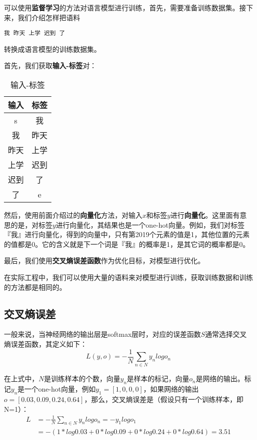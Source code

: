 可以使用\textbf{监督学习}的方法对语言模型进行训练，首先，需要准备训练数据集。接下来，我们介绍怎样把语料
\begin{lstlisting}[numbers=none]
    我 昨天 上学 迟到 了
\end{lstlisting}

转换成语言模型的训练数据集。

首先，我们获取\textbf{输入-标签}对：

\begin{table}[!h]
	\centering
	\setlength{\tabcolsep}{10mm}
	\caption{输入-标签}
	\begin{tabular}{cc}
		\hline
		输入 & 标签 \\ \hline
		s    & 我   \\
		我   & 昨天 \\
		昨天 & 上学 \\
		上学 & 迟到 \\
		迟到 & 了   \\
		了   & e    \\ \hline
	\end{tabular}
\end{table}


然后，使用前面介绍过的\textbf{向量化}方法，对输入$x$和标签$y$进行\textbf{向量化}。这里面有意思的是，对标签$y$进行向量化，其结果也是一个one-hot向量。例如，我们对标签『我』进行向量化，得到的向量中，只有第2019个元素的值是1，其他位置的元素的值都是0。它的含义就是下一个词是『我』的概率是1，是其它词的概率都是0。

最后，我们使用\textbf{交叉熵误差函数}作为优化目标，对模型进行优化。

在实际工程中，我们可以使用大量的语料来对模型进行训练，获取训练数据和训练的方法都是相同的。

\subsection{交叉熵误差}\label{Rnn:13}

一般来说，当神经网络的输出层是softmax层时，对应的误差函数$S$通常选择交叉熵误差函数，其定义如下：
\[
	L(y,o)=-\frac{1}{N}\sum_{n\in{N}}{y_nlogo_n}
\]

在上式中，$N$是训练样本的个数，向量\(y_n\)是样本的标记，向量\(o_n\)是网络的输出。标记\(y_n\)是一个one-hot向量，例如\(y_1=[1,0,0,0]\)，如果网络的输出\(o=[0.03,0.09,0.24,0.64]\)，那么，交叉熵误差是（假设只有一个训练样本，即N=1）：
\begin{align*}
	L & =-\frac{1}{N}\sum_{n\in{N}}{y_nlogo_n}=-y_1logo_1 \\
	  & =-(1*log0.03+0*log0.09+0*log0.24+0*log0.64)=3.51
\end{align*}



